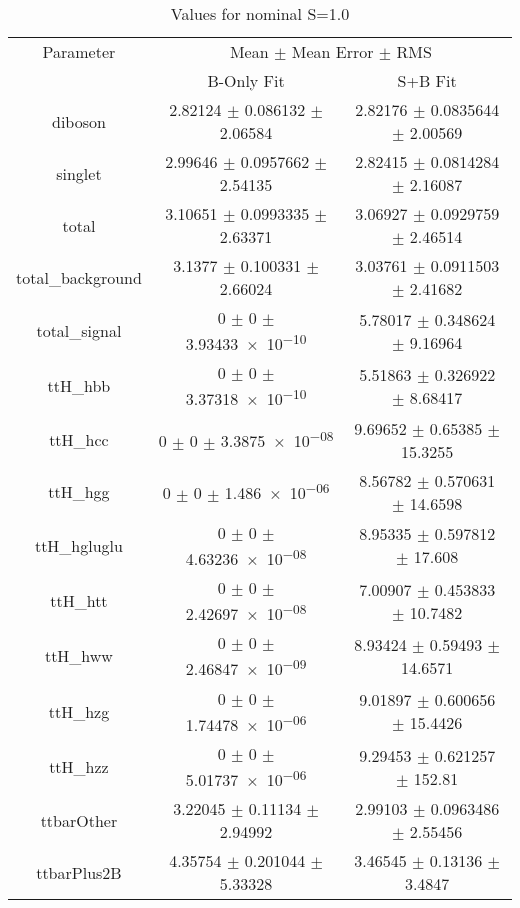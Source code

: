 \begin{table}
\centering
\caption{Values for nominal S=1.0}
\begin{tabular}{ccc}
\toprule
Parameter & \multicolumn{2}{c}{Mean $\pm$ Mean Error $\pm$ RMS}\\
 & B-Only Fit & S+B Fit\\
\midrule
diboson & \num{2.82124} $\pm$ \num{0.086132} $\pm$ \num{2.06584} & \num{2.82176} $\pm$ \num{0.0835644} $\pm$ \num{2.00569}\\
singlet & \num{2.99646} $\pm$ \num{0.0957662} $\pm$ \num{2.54135} & \num{2.82415} $\pm$ \num{0.0814284} $\pm$ \num{2.16087}\\
total & \num{3.10651} $\pm$ \num{0.0993335} $\pm$ \num{2.63371} & \num{3.06927} $\pm$ \num{0.0929759} $\pm$ \num{2.46514}\\
total\_background & \num{3.1377} $\pm$ \num{0.100331} $\pm$ \num{2.66024} & \num{3.03761} $\pm$ \num{0.0911503} $\pm$ \num{2.41682}\\
total\_signal & \num{0} $\pm$ \num{0} $\pm$ \num{3.93433e-10} & \num{5.78017} $\pm$ \num{0.348624} $\pm$ \num{9.16964}\\
ttH\_hbb & \num{0} $\pm$ \num{0} $\pm$ \num{3.37318e-10} & \num{5.51863} $\pm$ \num{0.326922} $\pm$ \num{8.68417}\\
ttH\_hcc & \num{0} $\pm$ \num{0} $\pm$ \num{3.3875e-08} & \num{9.69652} $\pm$ \num{0.65385} $\pm$ \num{15.3255}\\
ttH\_hgg & \num{0} $\pm$ \num{0} $\pm$ \num{1.486e-06} & \num{8.56782} $\pm$ \num{0.570631} $\pm$ \num{14.6598}\\
ttH\_hgluglu & \num{0} $\pm$ \num{0} $\pm$ \num{4.63236e-08} & \num{8.95335} $\pm$ \num{0.597812} $\pm$ \num{17.608}\\
ttH\_htt & \num{0} $\pm$ \num{0} $\pm$ \num{2.42697e-08} & \num{7.00907} $\pm$ \num{0.453833} $\pm$ \num{10.7482}\\
ttH\_hww & \num{0} $\pm$ \num{0} $\pm$ \num{2.46847e-09} & \num{8.93424} $\pm$ \num{0.59493} $\pm$ \num{14.6571}\\
ttH\_hzg & \num{0} $\pm$ \num{0} $\pm$ \num{1.74478e-06} & \num{9.01897} $\pm$ \num{0.600656} $\pm$ \num{15.4426}\\
ttH\_hzz & \num{0} $\pm$ \num{0} $\pm$ \num{5.01737e-06} & \num{9.29453} $\pm$ \num{0.621257} $\pm$ \num{152.81}\\
ttbarOther & \num{3.22045} $\pm$ \num{0.11134} $\pm$ \num{2.94992} & \num{2.99103} $\pm$ \num{0.0963486} $\pm$ \num{2.55456}\\
ttbarPlus2B & \num{4.35754} $\pm$ \num{0.201044} $\pm$ \num{5.33328} & \num{3.46545} $\pm$ \num{0.13136} $\pm$ \num{3.4847}\\

\end{tabular}
\end{table}
